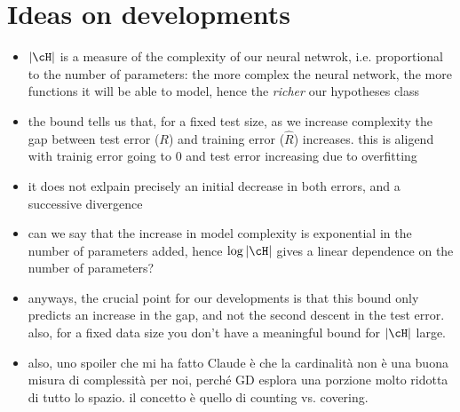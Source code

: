 \section{Ideas on developments}
\begin{itemize}
\item $\vert \cH\vert$ is a measure of the complexity of our neural netwrok, i.e. proportional to the number of parameters: the more complex the neural network, the more functions it will be able to model, hence the {\it richer} our hypotheses class

\item the bound tells us that, for a fixed test size, as we increase complexity the gap between test error ($R$) and training error ($\hat R$) increases. this is aligend with trainig error going to 0 and test error increasing due to overfitting

\item it does not exlpain precisely an initial decrease in both errors, and a successive divergence

\item can we say that the increase in model complexity is exponential in the number of parameters added, hence $\log\vert\cH\vert$ gives a linear dependence on the number of parameters? 

\item anyways, the crucial point for our developments is that this bound only predicts an increase in the gap, and not the second descent in the test error. also, for a fixed data size you don't have a meaningful bound for $\vert \cH\vert$ large. 

\item also, uno spoiler che mi ha fatto Claude è che la cardinalità non è una buona misura di complessità per noi, perché GD esplora una porzione molto ridotta di tutto lo spazio. il concetto è quello di counting vs. covering.

\end{itemize}
